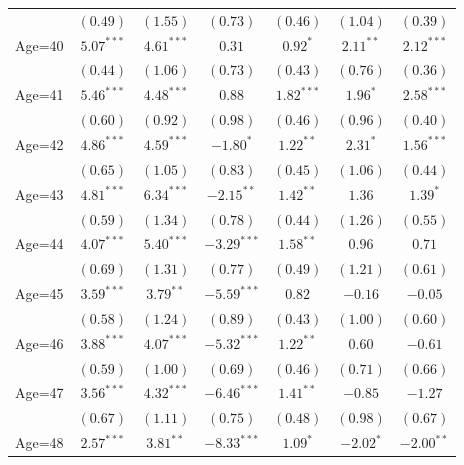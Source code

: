 \documentclass[fullpage]{paper}
\begin{document}
\begin{center}
\begin{longtable}{l c c c c c c }
            & $(0.49)$      & $(1.55)$      & $(0.73)$       & $(0.46)$      & $(1.04)$      & $(0.39)$      \\
Age=40      & $5.07^{***}$  & $4.61^{***}$  & $0.31$         & $0.92^{*}$    & $2.11^{**}$   & $2.12^{***}$  \\
            & $(0.44)$      & $(1.06)$      & $(0.73)$       & $(0.43)$      & $(0.76)$      & $(0.36)$      \\
Age=41      & $5.46^{***}$  & $4.48^{***}$  & $0.88$         & $1.82^{***}$  & $1.96^{*}$    & $2.58^{***}$  \\
            & $(0.60)$      & $(0.92)$      & $(0.98)$       & $(0.46)$      & $(0.96)$      & $(0.40)$      \\
Age=42      & $4.86^{***}$  & $4.59^{***}$  & $-1.80^{*}$    & $1.22^{**}$   & $2.31^{*}$    & $1.56^{***}$  \\
            & $(0.65)$      & $(1.05)$      & $(0.83)$       & $(0.45)$      & $(1.06)$      & $(0.44)$      \\
Age=43      & $4.81^{***}$  & $6.34^{***}$  & $-2.15^{**}$   & $1.42^{**}$   & $1.36$        & $1.39^{*}$    \\
            & $(0.59)$      & $(1.34)$      & $(0.78)$       & $(0.44)$      & $(1.26)$      & $(0.55)$      \\
Age=44      & $4.07^{***}$  & $5.40^{***}$  & $-3.29^{***}$  & $1.58^{**}$   & $0.96$        & $0.71$        \\
            & $(0.69)$      & $(1.31)$      & $(0.77)$       & $(0.49)$      & $(1.21)$      & $(0.61)$      \\
Age=45      & $3.59^{***}$  & $3.79^{**}$   & $-5.59^{***}$  & $0.82$        & $-0.16$       & $-0.05$       \\
            & $(0.58)$      & $(1.24)$      & $(0.89)$       & $(0.43)$      & $(1.00)$      & $(0.60)$      \\
Age=46      & $3.88^{***}$  & $4.07^{***}$  & $-5.32^{***}$  & $1.22^{**}$   & $0.60$        & $-0.61$       \\
            & $(0.59)$      & $(1.00)$      & $(0.69)$       & $(0.46)$      & $(0.71)$      & $(0.66)$      \\
Age=47      & $3.56^{***}$  & $4.32^{***}$  & $-6.46^{***}$  & $1.41^{**}$   & $-0.85$       & $-1.27$       \\
            & $(0.67)$      & $(1.11)$      & $(0.75)$       & $(0.48)$      & $(0.98)$      & $(0.67)$      \\
Age=48      & $2.57^{***}$  & $3.81^{**}$   & $-8.33^{***}$  & $1.09^{*}$    & $-2.02^{*}$   & $-2.00^{**}$  \\

\end{longtable}
\end{center}
\end{document}
